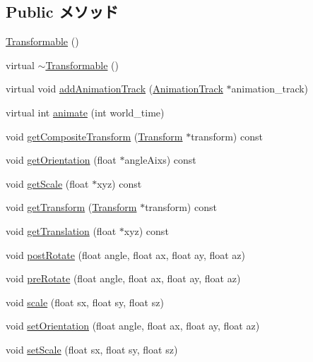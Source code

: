 \subsection*{Public メソッド}
\begin{CompactItemize}
\item 
\hyperlink{classm3g_1_1Transformable_ca6563203e3e883391c9d0927028aa04}{Transformable} ()
\item 
virtual \hyperlink{classm3g_1_1Transformable_89d9c7912ed11a30a312fd8f72b9ab22}{$\sim$Transformable} ()
\item 
virtual void \hyperlink{classm3g_1_1Transformable_415c0b110f95410ded9b85e5d99a496b}{addAnimationTrack} (\hyperlink{classm3g_1_1AnimationTrack}{AnimationTrack} $\ast$animation\_\-track)
\item 
virtual int \hyperlink{classm3g_1_1Transformable_8aad1ceab4c2a03609c8a42324ce484d}{animate} (int world\_\-time)
\item 
void \hyperlink{classm3g_1_1Transformable_263ef66efed11b7f9678e2e4bbec4c55}{getCompositeTransform} (\hyperlink{classm3g_1_1Transform}{Transform} $\ast$transform) const 
\item 
void \hyperlink{classm3g_1_1Transformable_f4df4d4858762f23a5562f7192e6d53c}{getOrientation} (float $\ast$angleAixs) const 
\item 
void \hyperlink{classm3g_1_1Transformable_b8a2dd11d0ba90e138625eb86a6a6083}{getScale} (float $\ast$xyz) const 
\item 
void \hyperlink{classm3g_1_1Transformable_73f387f99c527b382c8aaa54b8af6ed6}{getTransform} (\hyperlink{classm3g_1_1Transform}{Transform} $\ast$transform) const 
\item 
void \hyperlink{classm3g_1_1Transformable_d8aec42959fecc3d76f9539d3afa3c8d}{getTranslation} (float $\ast$xyz) const 
\item 
void \hyperlink{classm3g_1_1Transformable_4abf135257f132cdf9580f3a3e11ea6c}{postRotate} (float angle, float ax, float ay, float az)
\item 
void \hyperlink{classm3g_1_1Transformable_718b606184672eec83263ad44d5c7431}{preRotate} (float angle, float ax, float ay, float az)
\item 
void \hyperlink{classm3g_1_1Transformable_d94deaf828db5e2dfd5e40db42b64cd9}{scale} (float sx, float sy, float sz)
\item 
void \hyperlink{classm3g_1_1Transformable_980a9a2b5f6102763042e616d3aa4606}{setOrientation} (float angle, float ax, float ay, float az)
\item 
void \hyperlink{classm3g_1_1Transformable_937d04042c25021532ea2532fe5e3a32}{setScale} (float sx, float sy, float sz)

\end{CompactItemize}
